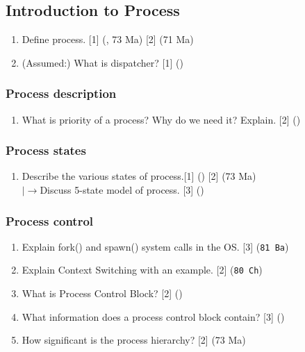\documentclass[12pt]{article}
\newcommand{\lb}{\\$\left|\rightarrow\right.$}
\begin{document}
	\subsection{Introduction to Process }
	\begin{enumerate}[noitemsep, topsep = 0pt]
		\item Define process. \hfill [1] (, 73 Ma) [2] (71 Ma)
		
		\item (Assumed:) What is dispatcher? \hfill [1] ()
	\end{enumerate}
	
	\subsubsection{Process description}
	\begin{enumerate}
		\item What is priority of a process? Why do we need it? Explain. \hfill [2] ()
	\end{enumerate}
	
	\subsubsection{Process states}
	\begin{enumerate}[noitemsep, topsep=0pt]
		\item Describe the various states of process.\hfill [1] () [2] (73 Ma)
		\lb Discuss 5-state model of process. \hfill [3] ()
	\end{enumerate}
	
	\subsubsection{Process control}
	\begin{enumerate}[noitemsep, topsep = 0pt]
		\item Explain fork() and spawn() system calls in the OS. \hfill [3] (\texttt{81 Ba})
		
		\item Explain Context Switching with an example. \hfill [2] (\texttt{80 Ch})
		
		\item What is Process Control Block? \hfill [2] ()		
		
		\item What information does a process control block contain? \hfill [3] ()
		
		\item How significant is the process hierarchy? \hfill [2] (73 Ma)
	\end{enumerate}
	
\end{document}
